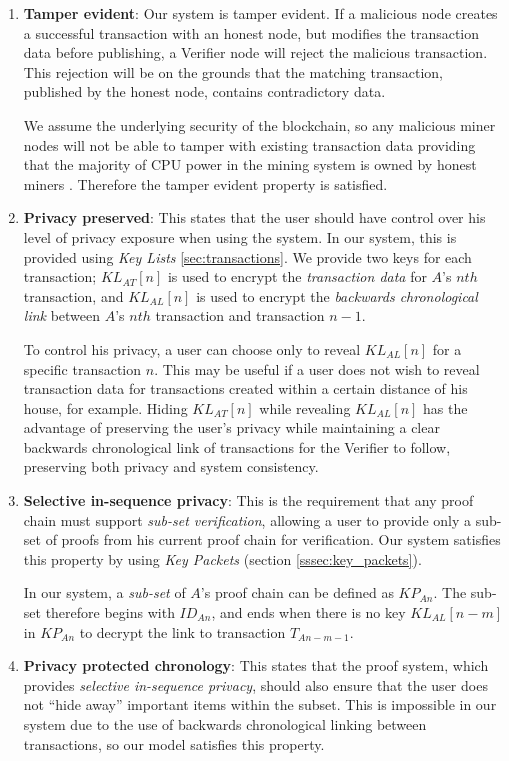 \begin{enumerate}
\item[] \textbf{Tamper evident}: Our system is tamper evident. If a malicious node creates a successful transaction with an honest node, but modifies the transaction data before publishing, a Verifier node will reject the malicious transaction. This rejection will be on the grounds that the matching transaction, published by the honest node, contains contradictory data.

We assume the underlying security of the blockchain, so any malicious miner nodes will not be able to tamper with existing transaction data providing that the majority of CPU power in the mining system is owned by honest miners \cite{bitcoin}. Therefore the tamper evident property is satisfied.

\item[] \textbf{Privacy preserved}: This states that the user should have control over his level of privacy exposure when using the system. In our system, this is provided using \textit{Key Lists} \ref{sec:transactions}. We provide two keys for each transaction; $KL_{AT}[n]$ is used to encrypt the \textit{transaction data} for $A$'s $nth$ transaction, and $KL_{AL}[n]$ is used to encrypt the \textit{backwards chronological link} between $A$'s $nth$ transaction and transaction $n-1$.

To control his privacy, a user can choose only to reveal $KL_{AL}[n]$ for a specific transaction $n$. This may be useful if a user does not wish to reveal transaction data for transactions created within a certain distance of his house, for example. Hiding $KL_{AT}[n]$ while revealing $KL_{AL}[n]$ has the advantage of preserving the user's privacy while maintaining a clear backwards chronological link of transactions for the Verifier to follow, preserving both privacy and system consistency.

\item[] \textbf{Selective in-sequence privacy}: This is the requirement that any proof chain must support \textit{sub-set verification}, allowing a user to provide only a sub-set of proofs from his current proof chain for verification. Our system satisfies this property by using \textit{Key Packets} (section \ref{sssec:key_packets}).

In our system, a \textit{sub-set} of $A$'s proof chain can be defined as $KP_{An}$. The sub-set therefore begins with $ID_{An}$, and ends when there is no key $KL_{AL}[n-m]$ in $KP_{An}$ to decrypt the link to transaction $T_{An-m-1}$. 

\item[] \textbf{Privacy protected chronology}: This states that the proof system, which provides \textit{selective in-sequence privacy}, should also ensure that the user does not ``hide away'' important items within the subset. This is impossible in our system due to the use of backwards chronological linking between transactions, so our model satisfies this property.


\end{enumerate}
